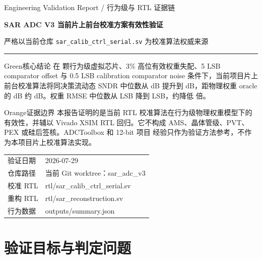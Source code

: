 \documentclass[UTF8,a4paper,11pt,fontset=windows]{ctexart}
\begin{document}
\begin{titlepage}
  \vspace*{16mm}
  {\sffamily\small\color{Teal}Engineering Validation Report / 行为级与 RTL 证据链}\par
  \vspace{5mm}
  {\Huge\sffamily\bfseries\color{DeepNavy}SAR ADC V3 当前片上前台校准方案有效性验证}\par
  \vspace{4mm}
  {\Large\color{Muted}严格以当前仓库 \texttt{sar\_calib\_ctrl\_serial.sv} 为校准算法权威来源}\par
  \vspace{10mm}
  \noindent\rule{\linewidth}{0.6pt}
  \vspace{6mm}

  \begin{verdictbox}{Green}{核心结论}
  在 \ValNChips{} 颗行为级虚拟芯片、3\% 高位有效权重失配、5 LSB comparator offset
  与 0.5 LSB calibration comparator noise 条件下，当前项目片上前台校准算法将同决策流动态
  SNDR 中位数从 \NominalSndrMed{} dB 提升到 \CalGainSndrMed{} dB，距物理权重 oracle
  的 \OracleSndrMed{} dB 约 \OracleGapDb{} dB。权重 RMSE 中位数从
  \NominalWeightRmseMed{} LSB 降到 \CalGainWeightRmseMed{} LSB，约降低
  \CalWeightReduction{} 倍。
  \end{verdictbox}

  \begin{verdictbox}{Orange}{证据边界}
  本报告证明的是当前 RTL 校准算法在行为级物理权重模型下的有效性，并辅以 Vivado XSIM
  RTL 回归。它不构成 AMS、晶体管级、PVT、PEX 或硅后签核。ADCToolbox 和 12-bit 项目
  经验只作为验证方法参考，不作为本项目片上校准算法实现。
  \end{verdictbox}

  \vfill
  \small
  \begin{tabular}{@{}ll@{}}
    验证日期 & 2026-07-29 \\
    仓库路径 & 当前 Git worktree：sar\_adc\_v3 \\
    校准 RTL & rtl/sar\_calib\_ctrl\_serial.sv \\
    重构 RTL & rtl/sar\_reconstruction.sv \\
    行为数据 & outputs/summary.json \\
  \end{tabular}
\end{titlepage}

\begingroup
\small
\setlength{\emergencystretch}{3em}
\tableofcontents
\endgroup
\clearpage

\section{验证目标与判定问题}
\end{document}
